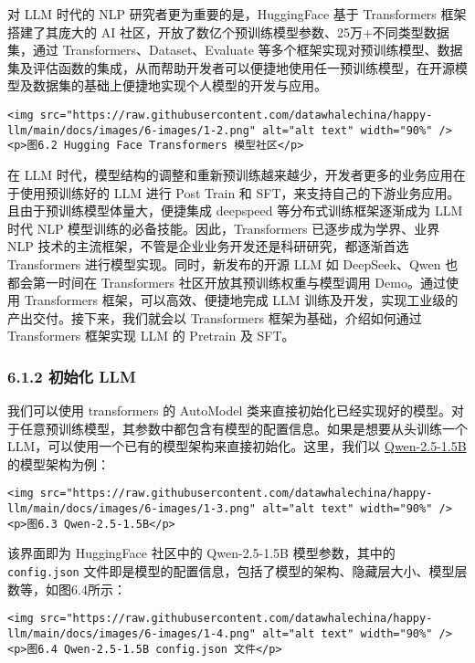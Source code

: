 \documentclass[
]{article}
\begin{document}
对 LLM 时代的 NLP 研究者更为重要的是，HuggingFace 基于 Transformers
框架搭建了其庞大的 AI
社区，开放了数亿个预训练模型参数、25万+不同类型数据集，通过
Transformers、Dataset、Evaluate
等多个框架实现对预训练模型、数据集及评估函数的集成，从而帮助开发者可以便捷地使用任一预训练模型，在开源模型及数据集的基础上便捷地实现个人模型的开发与应用。

\begin{verbatim}
<img src="https://raw.githubusercontent.com/datawhalechina/happy-llm/main/docs/images/6-images/1-2.png" alt="alt text" width="90%" />
<p>图6.2 Hugging Face Transformers 模型社区</p>
\end{verbatim}

在 LLM
时代，模型结构的调整和重新预训练越来越少，开发者更多的业务应用在于使用预训练好的
LLM 进行 Post Train 和
SFT，来支持自己的下游业务应用。且由于预训练模型体量大，便捷集成
deepspeed 等分布式训练框架逐渐成为 LLM 时代 NLP
模型训练的必备技能。因此，Transformers 已逐步成为学界、业界 NLP
技术的主流框架，不管是企业业务开发还是科研研究，都逐渐首选 Transformers
进行模型实现。同时，新发布的开源 LLM 如 DeepSeek、Qwen 也都会第一时间在
Transformers 社区开放其预训练权重与模型调用 Demo。通过使用 Transformers
框架，可以高效、便捷地完成 LLM
训练及开发，实现工业级的产出交付。接下来，我们就会以 Transformers
框架为基础，介绍如何通过 Transformers 框架实现 LLM 的 Pretrain 及 SFT。

\subsubsection{6.1.2 初始化 LLM}\label{ux521dux59cbux5316-llm}

我们可以使用 transformers 的 AutoModel
类来直接初始化已经实现好的模型。对于任意预训练模型，其参数中都包含有模型的配置信息。如果是想要从头训练一个
LLM，可以使用一个已有的模型架构来直接初始化。这里，我们以
\href{https://huggingface.co/Qwen/Qwen2.5-1.5B/tree/main}{Qwen-2.5-1.5B}的模型架构为例：

\begin{verbatim}
<img src="https://raw.githubusercontent.com/datawhalechina/happy-llm/main/docs/images/6-images/1-3.png" alt="alt text" width="90%" />
<p>图6.3 Qwen-2.5-1.5B</p>
\end{verbatim}

该界面即为 HuggingFace 社区中的 Qwen-2.5-1.5B 模型参数，其中的
\texttt{config.json}
文件即是模型的配置信息，包括了模型的架构、隐藏层大小、模型层数等，如图6.4所示：

\begin{verbatim}
<img src="https://raw.githubusercontent.com/datawhalechina/happy-llm/main/docs/images/6-images/1-4.png" alt="alt text" width="90%" />
<p>图6.4 Qwen-2.5-1.5B config.json 文件</p>
\end{verbatim}
\end{document}
